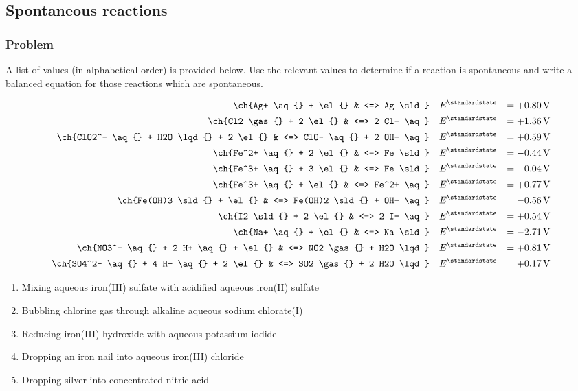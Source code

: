 \subsection{Spontaneous reactions}
\subsubsection{Problem}
A list of values (in alphabetical order) is provided below. Use the relevant values to
determine if a reaction is spontaneous and write a balanced equation for those reactions
which are spontaneous.

\begin{alignat*}{3}
	\ch{Ag+ \aq{} + \el{}                   & <=> Ag \sld} \quad                  & E^\standardstate & = +\qty{0.80}{\volt} \\
	\ch{Cl2 \gas{} + 2 \el{}                & <=> 2 Cl- \aq} \quad                & E^\standardstate & = +\qty{1.36}{\volt} \\
	\ch{ClO2^- \aq{} + H2O \lqd{} + 2 \el{} & <=> ClO- \aq{} + 2 OH- \aq} \quad   & E^\standardstate & = +\qty{0.59}{\volt} \\
	\ch{Fe^2+ \aq{} + 2 \el{}               & <=> Fe \sld} \quad                  & E^\standardstate & = \qty{-0.44}{\volt} \\
	\ch{Fe^3+ \aq{} + 3 \el{}               & <=> Fe \sld} \quad                  & E^\standardstate & = \qty{-0.04}{\volt} \\
	\ch{Fe^3+ \aq{} + \el{}                 & <=> Fe^2+ \aq} \quad                & E^\standardstate & = +\qty{0.77}{\volt} \\
	\ch{Fe(OH)3 \sld{} + \el{}              & <=> Fe(OH)2 \sld{} + OH- \aq} \quad & E^\standardstate & = \qty{-0.56}{\volt} \\
	\ch{I2 \sld{} + 2 \el{}                 & <=> 2 I- \aq} \quad                 & E^\standardstate & = +\qty{0.54}{\volt} \\
	\ch{Na+ \aq{} + \el{}                   & <=> Na \sld} \quad                  & E^\standardstate & = \qty{-2.71}{\volt} \\
	\ch{NO3^- \aq{} + 2 H+ \aq{} + \el{}    & <=> NO2 \gas{} + H2O \lqd} \quad    & E^\standardstate & = +\qty{0.81}{\volt} \\
	\ch{SO4^2- \aq{} + 4 H+ \aq{} + 2 \el{} & <=> SO2 \gas{} + 2 H2O \lqd} \quad  & E^\standardstate & = +\qty{0.17}{\volt} \\
\end{alignat*}

\begin{enumerate}
	\item Mixing aqueous iron(III) sulfate with acidified aqueous iron(II) sulfate
	\item Bubbling chlorine gas through alkaline aqueous sodium chlorate(I)
	\item Reducing iron(III) hydroxide with aqueous potassium iodide
	\item Dropping an iron nail into aqueous iron(III) chloride
	\item Dropping silver into concentrated nitric acid
\end{enumerate}


